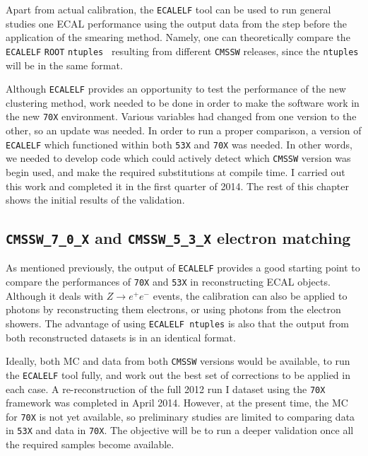 \documentclass[10pt]{article}
\begin{document}
Apart from actual calibration, the \texttt{ECALELF} tool can be used to run general studies one ECAL performance using the output data from the step before the application of the smearing method. Namely, one can theoretically compare the \texttt{ECALELF} \texttt{ROOT} \texttt{ntuples}~\cite{ntuple} resulting from different \texttt{CMSSW} releases, since the \texttt{ntuples} will be in the same format.

Although \texttt{ECALELF} provides an opportunity to test the performance of the new clustering method, work needed to be done in order to make the software work in the new \texttt{70X} environment. Various variables had changed from one version to the other, so an update was needed. In order to run a proper comparison, a version of \texttt{ECALELF} which functioned within both \texttt{53X} and \texttt{70X} was needed. In other words, we needed to develop code which could actively detect which \texttt{CMSSW} version was begin used, and make the required substitutions at compile time. I carried out this work and completed it in the first quarter of 2014. The rest of this chapter shows the initial results of the validation.

\subsection{\texttt{CMSSW\_7\_0\_X} and \texttt{CMSSW\_5\_3\_X} electron matching}

As mentioned previously, the output of \texttt{ECALELF} provides a good starting point to compare the performances of \texttt{70X} and \texttt{53X} in reconstructing ECAL objects. Although it deals with $Z\rightarrow e^+ e^-$ events, the calibration can also be applied to photons by reconstructing them electrons, or using photons from the electron showers. The advantage of using \texttt{ECALELF ntuples} is also that the output from both reconstructed datasets is in an identical format.

Ideally, both MC and data from both \texttt{CMSSW} versions would be available, to run the \texttt{ECALELF} tool fully, and work out the best set of corrections to be applied in each case. A re-reconstruction of the full 2012 run I dataset using the \texttt{70X} framework was completed in April 2014. However, at the present time, the MC for \texttt{70X} is not yet available, so preliminary studies are limited to comparing data in \texttt{53X} and data in \texttt{70X}. The objective will be to run a deeper validation once all the required samples become available.
\end{document}
